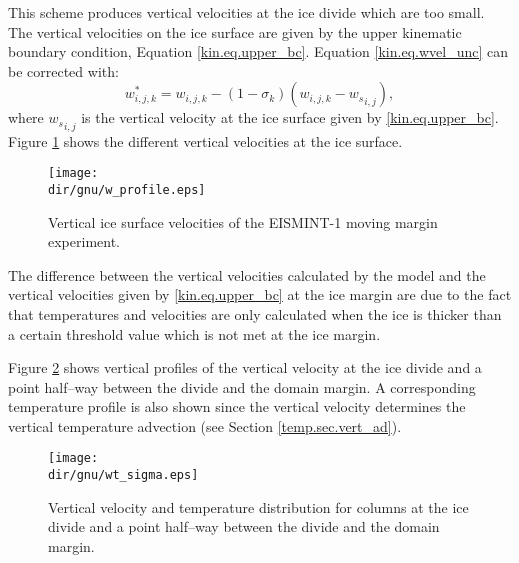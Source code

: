 This scheme produces vertical velocities at the ice divide which are too small. The vertical velocities on the ice surface are given by the upper kinematic boundary condition, Equation \eqref{kin.eq.upper_bc}. Equation \eqref{kin.eq.wvel_unc} can be corrected with:
\begin{equation}
  \label{kin.eq.wvel_cor}
   w^\ast_{i,j,k}=w_{i,j,k}-(1-\sigma_k)(w_{i,j,k}-{w_s}_{i,j}),
\end{equation}
where ${w_s}_{i,j}$ is the vertical velocity at the ice surface given by \eqref{kin.eq.upper_bc}. Figure \ref{kin.fig.w_profile} shows the different vertical velocities at the ice surface.
\begin{figure}[htbp]
  \centering
  \texttt{[image: \\dir/gnu/w\_profile.eps]}
  \caption{Vertical ice surface velocities of the EISMINT-1 moving margin experiment.}
  \label{kin.fig.w_profile}
\end{figure}
The difference between the vertical velocities calculated by the model and the vertical velocities given by \eqref{kin.eq.upper_bc} at the ice margin are due to the fact that temperatures and velocities are only calculated when the ice is thicker than a certain threshold value which is not met at the ice margin.

Figure \ref{kin.fig.wt_sigma} shows vertical profiles of the vertical velocity at the ice divide and a point half--way between the divide and the domain margin. A corresponding temperature profile is also shown since the vertical velocity determines the vertical temperature advection (see Section \ref{temp.sec.vert_ad}).
\begin{figure}[htbp]
  \centering
  \texttt{[image: \\dir/gnu/wt\_sigma.eps]}
  \caption{Vertical velocity and temperature distribution for columns at the ice divide and a point half--way between the divide and the domain margin.}
  \label{kin.fig.wt_sigma}
\end{figure}
